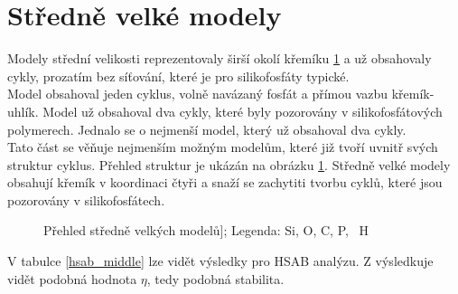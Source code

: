 \documentclass[
digital, %
table,   %
lof,     %
lot,     %
oneside,
]{fithesis3}
\begin{document}
\section{Středně velké modely}
Modely střední velikosti reprezentovaly širší okolí křemíku \ref{prehled_middle} a už obsahovaly cykly, prozatím bez síťování, které je pro silikofosfáty typické. \\
Model  obsahoval jeden cyklus, volně navázaný fosfát a přímou vazbu křemík-uhlík. Model  už obsahoval dva cykly, které byly pozorovány v silikofosfátových polymerech. Jednalo se o nejmenší model, který už obsahoval dva cykly.\\
Tato část se věňuje nejmenším možným modelům, které již tvoří uvnitř svých struktur cyklus. Přehled struktur je ukázán na obrázku \ref{prehled_middle}. Středně velké modely obsahují křemík v koordinaci čtyři a snaží se zachytiti tvorbu cyklů, které jsou pozorovány v silikofosfátech.
\begin{figure}
\begin{center}
\caption{Přehled středně velkých modelů];  Legenda:  Si,  O,  C,  P, ~H}
\label{prehled_middle}
\end{center}
\end{figure}
V tabulce \ref{hsab_middle} lze vidět výsledky pro HSAB analýzu. Z výsledkuje vidět podobná hodnota $\eta$, tedy podobná stabilita.
\end{document}
